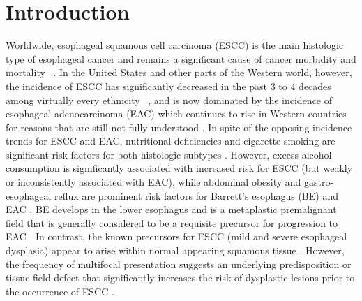 \documentclass[10pt,letterpaper]{article}
\begin{document}
\linenumbers

\section*{Introduction}
Worldwide, esophageal squamous cell carcinoma (ESCC) is the main histologic type of esophageal cancer and remains a significant cause of cancer morbidity and mortality ~\cite{Wang2018}. In the United States and other parts of the Western world, however, the incidence of ESCC has significantly decreased in the past 3 to 4 decades among virtually every ethnicity ~\cite{Wang2018, Gonzalez2013}, and is now dominated by the incidence of esophageal adenocarcinoma (EAC) which continues to rise in Western countries for reasons that are still not fully understood \cite{Kroep2014,Hazelton2015}. In spite of the opposing incidence trends for ESCC and EAC, nutritional deficiencies and  cigarette smoking are significant risk factors for both histologic subtypes \cite{Castro2018, Xie2018, NavarroSilvera2014}. However, excess alcohol consumption is significantly associated with increased risk for ESCC (but weakly or inconsistently associated with EAC), while abdominal obesity and gastro-esophageal reflux are prominent risk factors for Barrett's esophagus (BE) and EAC \cite{Castro2018, Xie2018, Thrift2014, Hazelton2015,NavarroSilvera2014, Drahos2016}. BE develops in the lower esophagus and is a metaplastic premalignant field that is generally considered to be a requisite precursor for progression to EAC \cite{Zhang2018}. In contrast, the known precursors for ESCC (mild and severe esophageal dysplasia) appear to arise within normal appearing squamous tissue \cite{Lam2020}. However, the frequency of multifocal presentation suggests an underlying predisposition or tissue field-defect that significantly increases the risk of dysplastic lesions prior to the occurrence of ESCC \cite{Tian1998, Katada2016, Kuwano1995}.  
\end{document}
